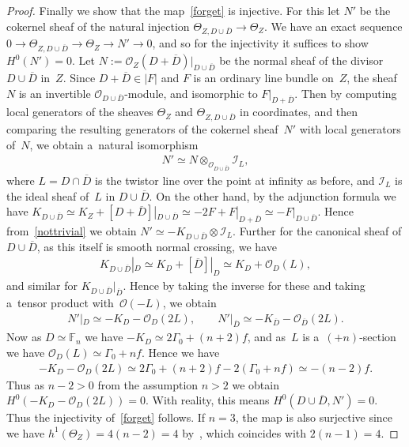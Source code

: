 \documentclass[11pt]{article}
\numberwithin{equation}{section}
\begin{document}
\begin{proof}
Finally we show that the map~\eqref{forget} is injective.
For this let $N'$ be the cokernel sheaf of the natural injection $\Theta_{Z,D\cup\overline D}\to \Theta_Z$.
We have an exact sequence $0\to \Theta_{Z, D\cup \overline D}\to \Theta_Z\to N'\to 0$, and so for the injectivity it
suf\/f\/ices to show $H^0(N') = 0$.
Let $N:=\mathscr O_Z(D+\overline D)|_{D\cup\overline D}$ be the normal sheaf of the divisor $D\cup \overline D$ in~$Z$.
Since $D+\overline D\in |F|$ and $F$ is an ordinary line bundle on~$Z$, the sheaf~$N$ is an invertible $\mathscr
O_{D\cup\overline D}$-module, and isomorphic to $F|_{D+\overline D}$.
Then by computing local generators of the sheaves $\Theta_{Z}$ and $\Theta_{Z,D\cup\overline D}$ in coordinates, and
then comparing the resulting generators of the cokernel sheaf~$N'$ with local generators of~$N$, we obtain a~natural
isomorphism
\begin{gather}
\label{nottrivial}
N'\simeq N\otimes_{\mathscr O_{D\cup\overline D}}\mathscr I_{L},
\end{gather}
where $L=D\cap \overline D$ is the twistor line over the point at inf\/inity as before, and $\mathscr I_L$ is the ideal
sheaf of~$L$ in $D\cup \overline D$.
On the other hand, by the adjunction formula we have $K_{D\cup\overline D} \simeq K_Z + [D+\overline D]|_{D\cup\overline
D}\simeq -2F + F|_{D+\overline D}\simeq -F|_{D\cup\overline D}$.
Hence from~\eqref{nottrivial} we obtain $N'\simeq -K_{D\cup\overline D}\otimes \mathscr I_L$.
Further for the canonical sheaf of $D\cup\overline D$, as this itself is smooth normal crossing, we have
\begin{gather*}%
K_{D\cup\overline D}|_D \simeq K_D +[\overline D]|_D \simeq K_D+\mathscr O_D(L),
\end{gather*}
and similar for $K_{D\cup\overline D}|_{\overline D}$.
Hence by taking the inverse for these and taking a~tensor product with~$\mathscr O(-L)$, we obtain
\begin{gather}
\label{N''}
N'|_D\simeq -K_D-\mathscr O_D(2L),
\qquad
N'|_{\overline D}\simeq -K_{\overline D}-\mathscr O_{\overline D}(2L).
\end{gather}
Now as $D\simeq\mathbb{F}_n$ we have $-K_D\simeq 2\Gamma_0+(n+2)f$, and as~$L$ is a~$(+n)$-section
we have $\mathscr O_D(L)\simeq \Gamma_0+nf$.
Hence we have
\begin{gather}
\label{N'}
-K_D-\mathscr O_D(2L) \simeq 2\Gamma_0+(n+2)f -2(\Gamma_0 + n f) \simeq -(n-2)f.
\end{gather}
Thus as $n-2>0$ from the assumption $n>2$ we obtain $H^0(-K_D-\mathscr O_D(2L))=0$.
With reality, this means $H^0(D\cup \overline D,N')=0$.
Thus the injectivity of~\eqref{forget} follows.
If $n=3$, the map is also surjective since we have $h^1(\Theta_Z) = 4(n-2) = 4$ by~\cite[Proposition~2.1]{HonCMP2}, which
coincides with $2(n-1) = 4$.
\end{proof}
\end{document}
